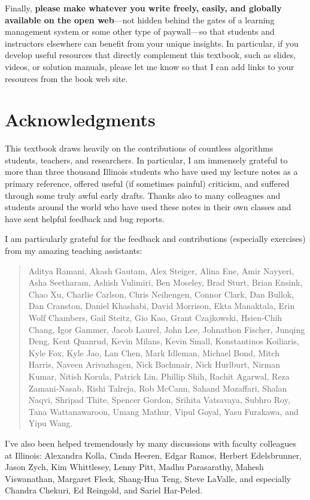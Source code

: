 Finally, \textbf{please make whatever you write freely, easily, and globally available on the open web}—not hidden behind the gates of a learning management system or some other type of paywall—so that students and instructors elsewhere can benefit from your unique insights. In particular, if you develop useful resources that directly complement this textbook, such as slides, videos, or solution manuals, please let me know so that I can add links to your resources from the book web site.

\section*{Acknowledgments}

This textbook draws heavily on the contributions of countless algorithms students, teachers, and researchers. In particular, I am immensely grateful to more than three thousand Illinois students who have used my lecture notes as a primary reference, offered useful (if sometimes painful) criticism, and suffered through some truly awful early drafts. Thanks also to many colleagues and students around the world who have used these notes in their own classes and have sent helpful feedback and bug reports.

I am particularly grateful for the feedback and contributions (especially exercises) from my amazing teaching assistants:

\begin{quote}
\small Aditya Ramani, Akash Gautam, Alex Steiger, Alina Ene, Amir Nayyeri, Asha Seetharam, Ashish Vulimiri, Ben Moseley, Brad Sturt, Brian Ensink, Chao Xu, Charlie Carlson, Chris Neihengen, Connor Clark, Dan Bullok, Dan Cranston, Daniel Khashabi, David Morrison, Ekta Manaktala, Erin Wolf Chambers, Gail Steitz, Gio Kao, Grant Czajkowski, Hsien-Chih Chang, Igor Gammer, Jacob Laurel, John Lee, Johnathon Fischer, Junqing Deng, Kent Quanrud, Kevin Milans, Kevin Small, Konstantinos Koiliaris, Kyle Fox, Kyle Jao, Lan Chen, Mark Idleman, Michael Bond, Mitch Harris, Naveen Arivazhagen, Nick Bachmair, Nick Hurlburt, Nirman Kumar, Nitish Korula, Patrick Lin, Phillip Shih, Rachit Agarwal, Reza Zamani-Nasab, Rishi Talreja, Rob McCann, Sahand Mozaffari, Shalan Naqvi, Shripad Thite, Spencer Gordon, Srihita Vatsavaya, Subhro Roy, Tana Wattanawaroon, Umang Mathur, Vipul Goyal, Yasu Furakawa, and Yipu Wang.
\end{quote}

I’ve also been helped tremendously by many discussions with faculty colleagues at Illinois: Alexandra Kolla, Cinda Heeren, Edgar Ramos, Herbert Edelsbrunner, Jason Zych, Kim Whittlesey, Lenny Pitt, Madhu Parasarathy, Mahesh Viswanathan, Margaret Fleck, Shang-Hua Teng, Steve LaValle, and especially Chandra Chekuri, Ed Reingold, and Sariel Har-Peled.

